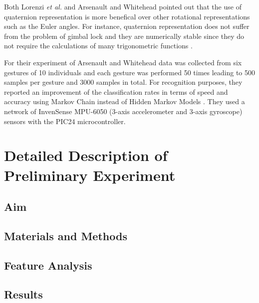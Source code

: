 \documentclass[10pt,journal,onecolumn,compsoc]{IEEEtran}
\begin{document}
Both Lorenzi \textit{et al.} \cite{Lorenzi2016} and Arsenault and Whitehead 
pointed out that the use of quaternion representation is more benefical over 
other rotational representations such as the Euler angles.
For instance, quaternion representation does not suffer from the problem of gimbal lock
and they are numerically stable 
since they do not require the calculations of many trigonometric functions \cite{Lorenzi2015, Arsenault2015_a, Munkundan2002}.

For their experiment of Arsenault and Whitehead 
data was collected from six gestures of 10 individuals and each gesture was 
performed 50 times leading to 500 samples per gesture and 3000 samples in total.
For recognition purposes, they reported an improvement of the classification rates
in terms of speed and accuracy using Markov Chain instead of Hidden Markov Models \cite{Arsenault2015_a, Arsenault2015_b}.
They used a network of InvenSense MPU-6050 (3-axis accelerometer and 3-axis gyroscope) sensors with the  PIC24 microcontroller.
  
% 
% 
% 
% 
\section{Detailed Description of Preliminary Experiment}

\subsection{Aim}

\subsection{Materials and Methods}

\subsection{Feature Analysis}

\subsection{Results}
\end{document}
